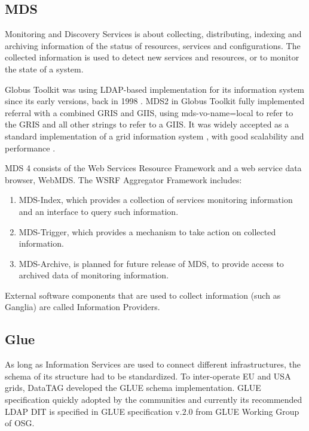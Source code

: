 \subsection{MDS}
Monitoring and Discovery Services is about collecting, distributing, indexing and archiving information of the status of resources, services and configurations. The collected information is used to detect new services and resources, or to monitor the state of a system.

Globus Toolkit was using LDAP-based implementation for its information system since its early versions, back in 1998 \cite{von1998usage}. MDS2 in Globus Toolkit fully implemented referral with a combined GRIS and GIIS, using mds-vo-name=local to refer to the GRIS and all other strings to refer to a GIIS. It was widely accepted as a standard implementation of a grid information system \cite{945188}, with good scalability and performance \cite{zhang2004performance}.


MDS 4 consists of the Web Services Resource Framework and a web service data browser, WebMDS. The WSRF Aggregator Framework includes:

\begin{enumerate}
  \item MDS-Index, which provides a collection of services monitoring information and an interface to query such information.
  \item MDS-Trigger, which provides a mechanism to take action on collected information.
  \item MDS-Archive, is planned for future release of MDS, to provide access to archived data of monitoring information.
\end{enumerate}

External software components that are used to collect information (such as Ganglia)\cite{gangliaWSRF} are called Information Providers.


\subsection{Glue}
As long as Information Services are used to connect different infrastructures, the schema of its structure had to be standardized. To inter-operate EU and USA grids, DataTAG developed the GLUE schema implementation. GLUE specification quickly adopted by the communities and currently its recommended LDAP DIT is specified in GLUE specification v.$2.0$ from GLUE Working Group of OSG.


